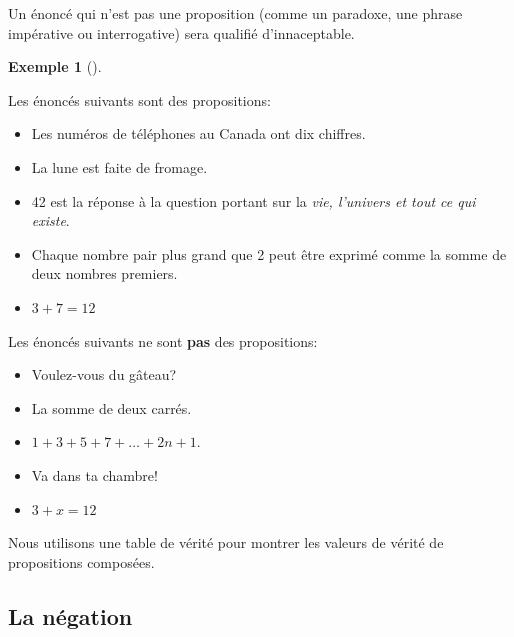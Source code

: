 \documentclass[
  letterpaper,
]{scrbook}
\providecommand{\tightlist}{%
  \setlength{\itemsep}{0pt}\setlength{\parskip}{0pt}}\usepackage{longtable,booktabs,array}
\theoremstyle{definition}
\newtheorem{example}{Exemple}[chapter]
\theoremstyle{definition}
\theoremstyle{plain}
\theoremstyle{remark}
\begin{document}
Un énoncé qui n'est pas une proposition (comme un paradoxe, une phrase
impérative ou interrogative) sera qualifié d'innaceptable.

\leavevmode{}%
\begin{example}[]\label{exm-propositions}

Les énoncés suivants sont des propositions:

\begin{itemize}
\tightlist
\item
  Les numéros de téléphones au Canada ont dix chiffres.
\item
  La lune est faite de fromage.
\item
  42 est la réponse à la question portant sur la \emph{vie, l'univers et
  tout ce qui existe}.
\item
  Chaque nombre pair plus grand que 2 peut être exprimé comme la somme
  de deux nombres premiers.
\item
  \(3+7=12\)
\end{itemize}

Les énoncés suivants ne sont \textbf{pas} des propositions:

\begin{itemize}
\tightlist
\item
  Voulez-vous du gâteau?
\item
  La somme de deux carrés.
\item
  \(1+3+5+7+\ldots +2n+1\).
\item
  Va dans ta chambre!
\item
  \(3+x=12\)
\end{itemize}

\end{example}

Nous utilisons une table de vérité pour montrer les valeurs de vérité de
propositions composées.

\hypertarget{la-nuxe9gation}{%
\subsection{La négation}\label{la-nuxe9gation}}
\end{document}
